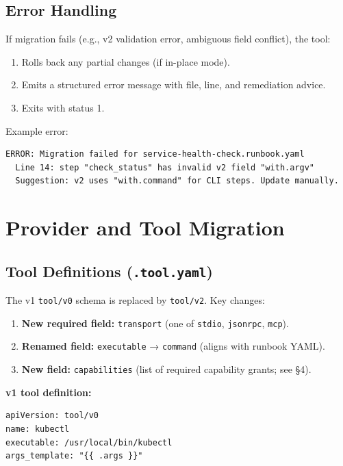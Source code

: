 \subsection{Error Handling}

If migration fails (e.g., v2 validation error, ambiguous field conflict), the tool:
\begin{enumerate}
  \item Rolls back any partial changes (if in-place mode).
  \item Emits a structured error message with file, line, and remediation advice.
  \item Exits with status 1.
\end{enumerate}

Example error:

\begin{verbatim}
ERROR: Migration failed for service-health-check.runbook.yaml
  Line 14: step "check_status" has invalid v2 field "with.argv"
  Suggestion: v2 uses "with.command" for CLI steps. Update manually.
\end{verbatim}

\section{Provider and Tool Migration}
\label{sec:provider-tool-migration}

\subsection{Tool Definitions (\texttt{.tool.yaml})}

The v1 \texttt{tool/v0} schema is replaced by \texttt{tool/v2}. Key changes:

\begin{enumerate}
  \item \textbf{New required field:} \texttt{transport} (one of \texttt{stdio}, \texttt{jsonrpc}, \texttt{mcp}).
  \item \textbf{Renamed field:} \texttt{executable} → \texttt{command} (aligns with runbook YAML).
  \item \textbf{New field:} \texttt{capabilities} (list of required capability grants; see §4).
\end{enumerate}

\textbf{v1 tool definition:}
\begin{verbatim}
apiVersion: tool/v0
name: kubectl
executable: /usr/local/bin/kubectl
args_template: "{{ .args }}"
\end{verbatim}


